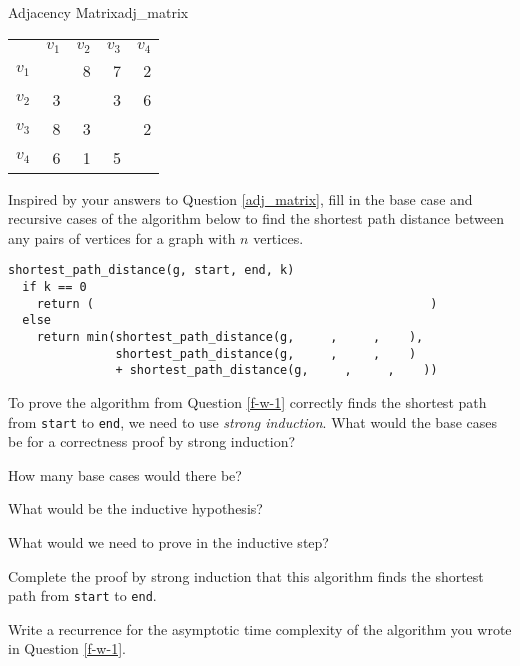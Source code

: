 \documentclass{tufte-handout}
\begin{document}
\begin{questions}
\begin{model}{Adjacency Matrix}{adj_matrix}
\begin{tabular}{ l r r r r }
      & $v_1$ & $v_2$ & $v_3$ & $v_4$ \\
$v_1$ &       & 8     & 7     & 2 \\
$v_2$ & 3     &       & 3     & 6 \\
$v_3$ & 8     & 3     &       & 2 \\
$v_4$ & 6     & 1     & 5     &   \\
\end{tabular}
\label{adj_matrix}
\end{model}

\item Inspired by your answers to Question \ref{adj_matrix}, fill in the base case and recursive cases of the algorithm below to find the shortest path distance between any pairs of vertices for a graph with $n$ vertices. \label{f-w-1}

\begin{verbatim}
shortest_path_distance(g, start, end, k)
  if k == 0
    return (                                               )
  else 
    return min(shortest_path_distance(g,     ,     ,    ),
               shortest_path_distance(g,     ,     ,    ) 
               + shortest_path_distance(g,     ,     ,    ))
\end{verbatim}

\item To prove the algorithm from Question \ref{f-w-1} correctly finds the shortest path from \verb|start| to \verb|end|, we need to use \emph{strong induction}.  What would the base cases be for a correctness proof by strong induction?

\item How many base cases would there be?

\item What would be the inductive hypothesis?

\item What would we need to prove in the inductive step?

\item Complete the proof by strong induction that this algorithm finds the shortest path from \verb|start| to \verb|end|.

\item Write a recurrence for the asymptotic time complexity of the algorithm you wrote in Question \ref{f-w-1}. \label{recurrence}


\end{questions}
\end{document}

